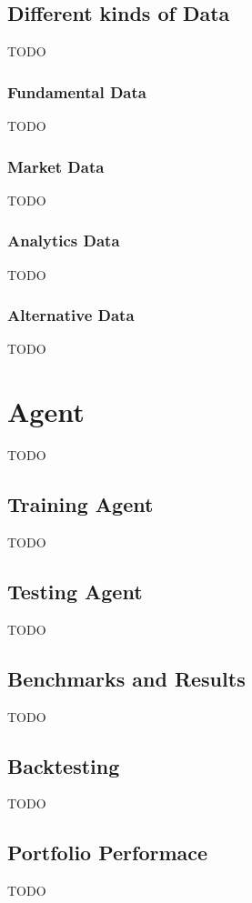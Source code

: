 \section{Different kinds of Data}
TODO

\subsection{Fundamental Data}
TODO

\subsection{Market Data}
TODO

\subsection{Analytics Data}
TODO

\subsection{Alternative Data}
TODO




\chapter{Agent}
TODO


\section{Training Agent}
TODO


\section{Testing Agent}
TODO


\section{Benchmarks and Results}
TODO


\section{Backtesting}
TODO


\section{Portfolio Performace}
TODO


